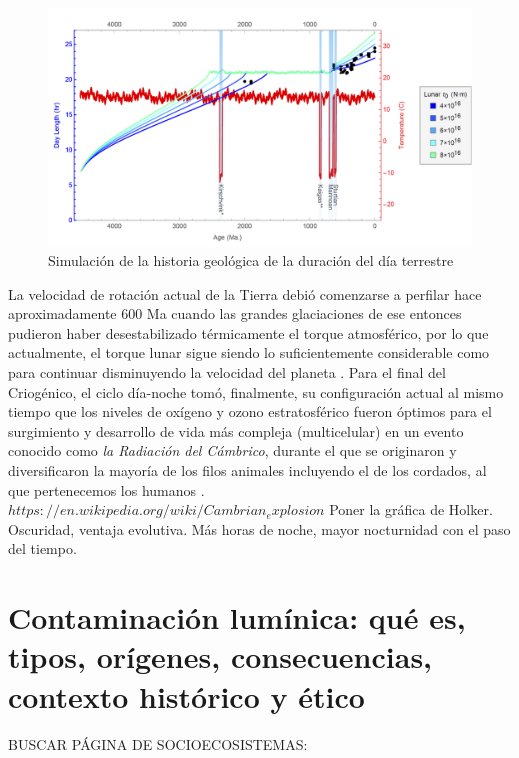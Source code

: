 \begin{figure}
  \centering
    \includegraphics[width=1\textwidth]{duraciondeldiahistorico}
  \caption{Simulación de la historia geológica de la duración del día terrestre \citep{Stevenson&Bartlett2016}}
  \label{duraciondia}
\end{figure}

La velocidad de rotación actual de la Tierra debió comenzarse a perfilar hace aproximadamente 600 Ma cuando las grandes glaciaciones de ese entonces pudieron haber desestabilizado térmicamente el torque atmosférico, por lo que actualmente, el torque lunar sigue siendo lo suficientemente considerable como para continuar disminuyendo la velocidad del planeta \citep{Stevenson&Bartlett2016}. Para el final del Criogénico, el ciclo día-noche tomó, finalmente, su configuración actual al mismo tiempo que los niveles de oxígeno y ozono estratosférico fueron óptimos para el surgimiento y desarrollo de vida más compleja (multicelular) en un evento conocido como \textit{la Radiación del Cámbrico}, durante el que se originaron y diversificaron la mayoría de los filos animales incluyendo el de los cordados, al que pertenecemos los humanos .\\

$https://en.wikipedia.org/wiki/Cambrian_explosion$	
Poner la gráfica de Holker. Oscuridad, ventaja evolutiva. Más horas de noche, mayor nocturnidad con el paso del tiempo.\\

\section{Contaminación lumínica: qué es, tipos, orígenes, consecuencias, contexto histórico y ético}

BUSCAR PÁGINA DE SOCIOECOSISTEMAS:

